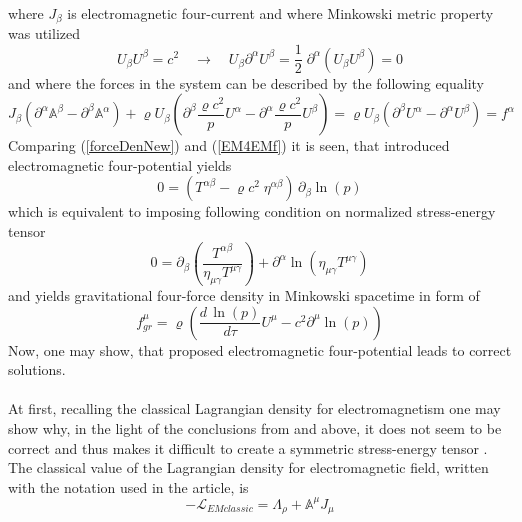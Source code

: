 \documentclass[aps,prx,preprint,groupedaddress,showkeys]{revtex4-2}
\newcommand{\mds}[1] {\frac{d {#1}}{d\tau}}
\begin{document}
where $J_{\beta}$ is electromagnetic four-current and where Minkowski metric property was utilized
\begin{equation} \label{MPR}
U_{\beta}U^{\beta} = c^2 \quad \rightarrow \quad U_{\beta}\partial^{\alpha}U^{\beta}=\frac{1}{2}\;  \partial^{\alpha} \left ( U_{\beta}U^{\beta} \right ) = 0 
\end{equation}
and where the forces in the system can be described by the following equality
\begin{equation} \label{Equality}
J_{\beta} \left ( \partial^{\alpha}\mathbb{A}^{\beta} - \partial^{\beta}\mathbb{A}^{\alpha} \right ) + \varrho U_{\beta} \left ( \partial^{\beta} \frac{\varrho c^2}{p} U^{\alpha} - \partial^{\alpha}\frac{\varrho c^2}{p} U^{\beta} \right ) = \varrho U_{\beta} \left ( \partial^{\beta} U^{\alpha} - \partial^{\alpha} U^{\beta} \right ) = f^{\alpha}
\end{equation}
Comparing (\ref{forceDenNew}) and (\ref{EM4EMf}) it is seen, that introduced electromagnetic four-potential yields 
\begin{equation} \label{For0tens}
0 = \left ( T^{\alpha \beta} - \varrho c^2 \; \eta^{\alpha \beta} \right ) \, \partial_{\beta} \ln{(p)}
\end{equation}
which is equivalent to imposing following condition on normalized stress-energy tensor
\begin{equation} \label{normCond}
0 = \partial_{\beta} \left ( \frac{T^{\alpha \beta}}{\eta_{\mu \gamma}T^{\mu \gamma}}  \right ) + \partial^{\alpha} \ln{\left ( \eta_{\mu \gamma} T^{\mu \gamma} \right )}
\end{equation}
and yields gravitational four-force density in Minkowski spacetime in form of
\begin{equation} \label{SIMGR}
f^{\mu}_{gr} = \varrho \left ( \mds{\, \ln{(p)}} U^{\mu} - c^2 \partial^{\mu} \ln{(p)} \right )
\end{equation}
Now, one may show, that proposed electromagnetic four-potential leads to correct solutions.\\
~\\
At first, recalling the classical Lagrangian density \cite{LagDen} for electromagnetism one may show why, in the light of the conclusions from \cite{PMofC} and above, it does not seem to be correct and thus makes it difficult to create a symmetric stress-energy tensor \cite{MEDP}. The classical value of the Lagrangian density for electromagnetic field, written with the notation used in the article, is
\begin{equation} \label{CLASSLAG}
- \mathcal{L}_{EMclassic} = \Lambda_{\rho} + \mathbb{A}^{\mu} J_{\mu}
\end{equation}
\end{document}
